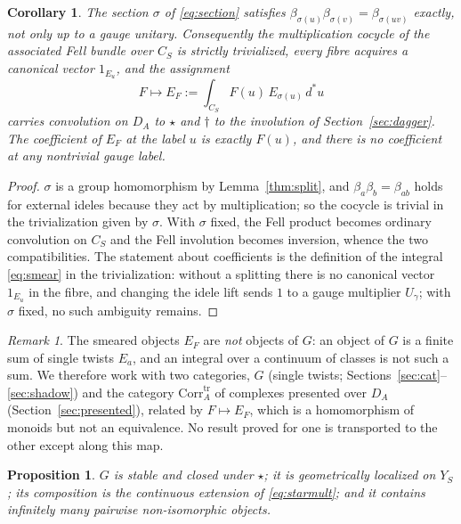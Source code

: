 \documentclass[11pt]{amsart}
\newtheorem{proposition}[theorem]{Proposition}
\newtheorem{corollary}[theorem]{Corollary}
\theoremstyle{definition}
\theoremstyle{remark}
\newtheorem{remark}[theorem]{Remark}
\newcommand{\dstar}{\,d^{*}}
\newcommand{\DA}{D_A}
\newcommand{\Corrtr}{\mathrm{Corr}^{\mathrm{tr}}_{A}}
\begin{document}
\begin{corollary}\label{cor:trivial}
The section $\sigma$ of \eqref{eq:section} satisfies
$\beta_{\sigma(u)}\beta_{\sigma(v)}=\beta_{\sigma(uv)}$ exactly, not only up to
a gauge unitary.
Consequently the multiplication cocycle of the associated Fell bundle over
$C_S$ is strictly trivialized, every fibre acquires a canonical vector
$1_{E_u}$, and the assignment
\begin{equation}\label{eq:smear}
F\longmapsto E_F:=\int_{C_S}F(u)\,E_{\sigma(u)}\dstar u
\end{equation}
carries convolution on $\DA$ to $\star$ and $\dagger$ to the involution of
Section~\ref{sec:dagger}.  The coefficient of $E_F$ at the label $u$ is
exactly $F(u)$, and there is no coefficient at any nontrivial gauge label.
\end{corollary}

\begin{proof}
$\sigma$ is a group homomorphism by Lemma~\ref{thm:split}, and
$\beta_a\beta_b=\beta_{ab}$ holds for external ideles because they act by
multiplication; so the cocycle is trivial in the trivialization given by
$\sigma$.  With $\sigma$ fixed, the Fell product becomes ordinary convolution
on $C_S$ and the Fell involution becomes inversion, whence the two
compatibilities.  The statement about coefficients is the definition of the
integral \eqref{eq:smear} in the trivialization: without a splitting there is
no canonical vector $1_{E_u}$ in the fibre, and changing the idele lift sends
$1$ to a gauge multiplier $U_{\gamma}$; with $\sigma$ fixed, no such ambiguity
remains.
\end{proof}

\begin{remark}\label{rem:types}
The smeared objects $E_F$ are \emph{not} objects of $G$: an object of $G$ is a
finite sum of single twists $E_a$, and an integral over a continuum of classes
is not such a sum.  We therefore work with two categories, $G$ (single twists;
Sections~\ref{sec:cat}--\ref{sec:shadow}) and the category $\Corrtr$ of
complexes presented over $\DA$ (Section~\ref{sec:presented}), related by
$F\mapsto E_F$, which is a homomorphism of monoids but not an equivalence.
No result proved for one is transported to the other except along this map.
\end{remark}

\begin{proposition}\label{prop:cat}
$G$ is stable and closed under $\star$; it is geometrically localized on
$Y_S$; its composition is the continuous extension of \eqref{eq:starmult}; and
it contains infinitely many pairwise
non-isomorphic objects.
\end{proposition}
\end{document}
